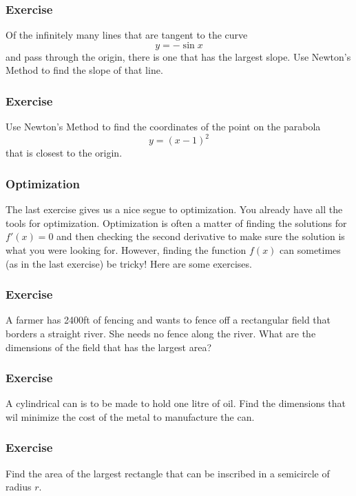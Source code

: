 \documentclass[xcolor=dvipsnames]{beamer}
\begin{document}
\begin{frame}
  \frametitle{Exercise}
{\ubung} Of the infinitely many lines that are tangent to the curve
\begin{equation}
  \label{eq:ohtooyiv}
  y=-\sin{}x
\end{equation}
and pass through the origin, there is one that has the largest slope.
Use Newton's Method to find the slope of that line.
\end{frame}

\begin{frame}
  \frametitle{Exercise}
{\ubung} Use Newton's Method to find the coordinates of the point on
the parabola
\begin{equation}
  \label{eq:laingiun}
  y=(x-1)^{2}
\end{equation}
that is closest to the origin.
\end{frame}

\begin{frame}
  \frametitle{Optimization}
  The last exercise gives us a nice segue to \alert{optimization}. You
  already have all the tools for optimization. Optimization is often a
  matter of finding the solutions for $f'(x)=0$ and then checking the
  second derivative to make sure the solution is what you were looking
  for. However, finding the function $f(x)$ can sometimes (as in the
  last exercise) be tricky! Here are some exercises.
\end{frame}

\begin{frame}
  \frametitle{Exercise}
  {\ubung} A farmer has 2400ft of fencing and wants to fence off a
  rectangular field that borders a straight river. She needs no fence
  along the river. What are the dimensions of the field that has the
  largest area?
\end{frame}

\begin{frame}
  \frametitle{Exercise}
  {\ubung} A cylindrical can is to be made to hold one litre of oil.
  Find the dimensions that wil minimize the cost of the metal to
  manufacture the can.
\end{frame}

\begin{frame}
  \frametitle{Exercise}
  {\ubung} Find the area of the largest rectangle that can be
  inscribed in a semicircle of radius $r$.
\end{frame}
\end{document}
